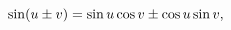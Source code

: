\[\mathop{\sin\/}\nolimits\!\left(u\pm v\right)=\mathop{\sin\/}\nolimits u%
\mathop{\cos\/}\nolimits v\pm\mathop{\cos\/}\nolimits u\mathop{\sin\/}%
\nolimits v,\]
